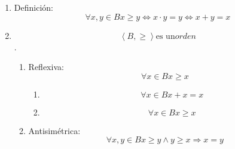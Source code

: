 \begin{enumerate}
\begin{enumerate}
\begin{enumerate}
\begin{enumerate}
        \begin{enumerate}
        \def\labelenumv{\arabic{enumv}.}
        \tightlist
        \item
          \[x,{y \in B}{{x \leq {y \land y}} \leq x}\]
        \item
          \[x,{y \in B}{{{x \cdot y} = {{y \land x} \cdot y}} = x}\]
        \item
          \[x,{y \in B}{x = y}\]
        \end{enumerate}
      \item
        Transitiva:
        \[\forall x,y,{z \in B}{{x \leq {y \land y}} \leq z}\Rightarrow{x \leq z}\]

        \begin{enumerate}
        \def\labelenumv{\arabic{enumv}.}
        \tightlist
        \item
          \[{x \leq {y \land y}} \leq z\]
        \item
          \[{{x \cdot y} = {{x \land y} \cdot z}} = y\]
        \item
          \[{{x \cdot y} \cdot z} = {x \cdot z}\]
        \item
          \[{x \cdot y} = {x \cdot z}\]
        \item
          \[x = {x \cdot z}\]
        \item
          \[x \leq z\]
        \end{enumerate}
      \end{enumerate}
    \item
      Definición:\[\forall x,{y \in B}{x \geq y}\Leftrightarrow{{x \cdot y} = y}\Leftrightarrow{{x + y} = x}\]
    \item
      \[\left\langle {B, \geq} \right\rangle\text{es un}\mathit{orden}\].

      \begin{enumerate}
      \def\labelenumiv{\arabic{enumiv}.}
      \item
        Reflexiva: \[\forall{x \in B}{x \geq x}\]

        \begin{enumerate}
        \def\labelenumv{\arabic{enumv}.}
        \tightlist
        \item
          \[\forall{x \in B}{{x + x} = x}\]
        \item
          \[\forall{x \in B}{x \geq x}\]
        \end{enumerate}
      \item
        Antisimétrica:
        \[\forall x,{y \in B}{{x \geq {y \land y}} \geq x}\Rightarrow{x = y}\]


\end{enumerate}
\end{enumerate}
\end{enumerate}
\end{enumerate}
